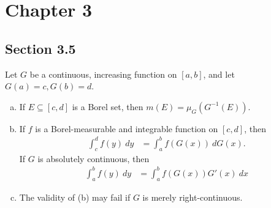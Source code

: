 \documentclass[10pt]{mypackage}
\begin{document}
\section{Chapter 3}%
\subsection{Section 3.5}%
\begin{exercise}[Exercise 36]
  Let $G$ be a continuous, increasing function on $\left[ a,b \right]$, and let $G(a)=c,G(b)=d$.
  \begin{enumerate}[(a)]
    \item If $E\subseteq \left[ c,d \right]$ is a Borel set, then $m\left( E \right) = \mu_G\left( G^{-1}(E) \right)$.
    \item If $f$ is a Borel-measurable and integrable function on $\left[ c,d \right]$, then 
      \begin{align*}
        \int_{c}^{d} f(y)\:dy &= \int_{a}^{b} f\left( G(x) \right)\:dG(x).
      \end{align*}
      If $G$ is absolutely continuous, then
      \begin{align*}
        \int_{a}^{b} f(y)\:dy &= \int_{a}^{b} f\left( G(x) \right)G'(x)\:dx
      \end{align*}
    \item The validity of (b) may fail if $G$ is merely right-continuous.
  \end{enumerate}
\end{exercise}
\end{document}
